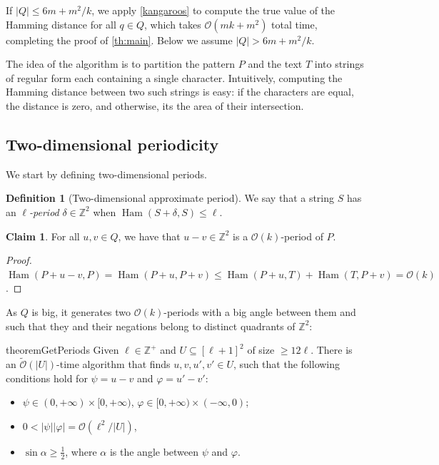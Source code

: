 \documentclass[11pt, letterpaper]{article}
\theoremstyle{plain}
\theoremstyle{definition}
\newtheorem{definition}{Definition}
\newtheorem{claim}{Claim}
\theoremstyle{remark}
\newcommand{\Z}{\mathbb{Z}}
\renewcommand{\O}{\mathcal{O}}
\newcommand{\tO}{\tilde{\mathcal{O}}}
\renewcommand{\phi}{\varphi}
\DeclareMathOperator*{\Ham}{Ham}
\begin{document}
If $|Q| \le 6m + m^2/k$, we apply \cref{kangaroos} to compute the true value of the Hamming distance for all $q \in Q$, which takes $\O(mk+m^2)$ total time, completing the proof of \cref{th:main}. Below we assume $|Q| > 6m + m^2/k$. 

The idea of the algorithm is to partition the pattern $P$ and the text $T$ into strings of regular form each containing a single character. Intuitively, computing the Hamming distance between two such strings is easy: if the characters are equal, the distance is zero, and otherwise, its the area of their intersection.

\subsection{Two-dimensional periodicity} \label{periodicity_section}
We start by defining two-dimensional periods.



\begin{definition}[Two-dimensional approximate period]
We say that a string $S$ has an \emph{$\ell$-period} $\delta \in \Z^2$ when $\Ham(S + \delta, S) \le \ell$.
\end{definition}


\begin{claim} \label{periodicity_lemma}
For all $u, v \in Q$, we have that $u - v \in \Z^2$ is a $\O(k)$-period of $P$.
\end{claim}	
\begin{proof}
$\Ham(P + u - v, P) = \Ham(P + u, P + v) \le \Ham(P + u, T) + \Ham(T,P + v) = \O(k)$.
\end{proof}

As $Q$ is big, it generates two $\O(k)$-periods with a big angle between them and such that they and their negations belong to distinct quadrants of $\Z^2$: 

\begin{restatable*}{theorem}{GetPeriods}\label{get_periods}
Given $\ell \in \Z^+$ and $U \subseteq [\ell + 1]^2$ of size $\ge 12\ell$. There is an $\tO(|U|)$-time algorithm that finds $u, v, u', v' \in U$, such that the following conditions hold for $\psi = u - v$ and $\phi = u' - v'$:
	\begin{itemize}
		\item $\psi \in (0, +\infty) \times [0, +\infty)$, $\phi \in [0, +\infty) \times (-\infty, 0)$;
		\item $0 < |\psi||\phi| = \O(\ell^2 / |U|)$,
		\item $\sin \alpha \ge \frac{1}{2}$, where $\alpha$ is the angle between $\psi$ and $\phi$.
	\end{itemize}
\end{restatable*}
\end{document}
